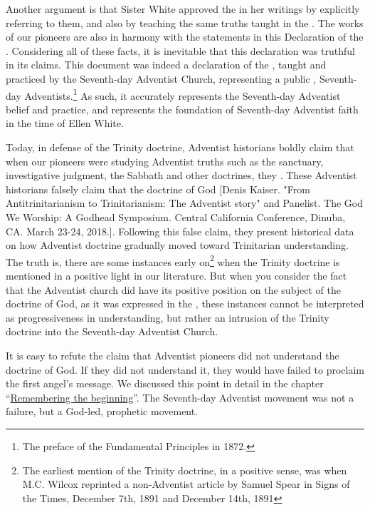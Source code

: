 Another argument is that Sister White approved the  in her writings by explicitly referring to them, and also by teaching the same truths taught in the . The works of our pioneers are also in harmony with the statements in this Declaration of the . Considering all of these facts, it is inevitable that this declaration was truthful in its claims. This document was indeed a declaration of the , taught and practiced by the Seventh-day Adventist Church, representing a public ,  Seventh-day Adventists.\footnote{The preface of the Fundamental Principles in 1872.} As such, it accurately represents the Seventh-day Adventist belief and practice, and represents the foundation of Seventh-day Adventist faith in the time of Ellen White.

Today, in defense of the Trinity doctrine, Adventist historians boldly claim that when our pioneers were studying Adventist truths such as the sanctuary, investigative judgment, the Sabbath and other doctrines, they . These Adventist historians falsely claim that the doctrine of God [Denis Kaiser. "From Antitrinitarianism to Trinitarianism: The Adventist story" and Panelist. The God We Worship: A Godhead Symposium. Central California Conference, Dinuba, CA. March 23-24, 2018.]. Following this false claim, they present historical data on how Adventist doctrine gradually moved toward Trinitarian understanding. The truth is, there are some instances early on\footnote{The earliest mention of the Trinity doctrine, in a positive sense, was when M.C. Wilcox reprinted a non-Adventist article by Samuel Spear in Signs of the Times, December 7th, 1891 and December 14th, 1891} when the Trinity doctrine is mentioned in a positive light in our literature. But when you consider the fact that the Adventist church did have its positive position on the subject of the doctrine of God, as it was expressed in the , these instances cannot be interpreted as progressiveness in understanding, but rather an intrusion of the Trinity doctrine into the Seventh-day Adventist Church.

It is easy to refute the claim that Adventist pioneers did not understand the doctrine of God. If they did not understand it, they would have failed to proclaim the first angel’s message. We discussed this point in detail in the chapter “\hyperref[chap:remebering-the-beginning]{Remembering the beginning}”. The Seventh-day Adventist movement was not a failure, but a God-led, prophetic movement.

